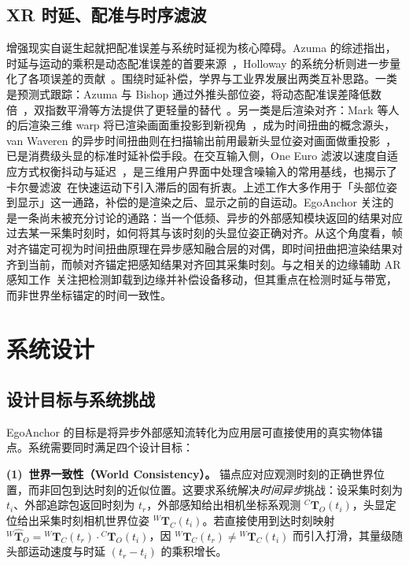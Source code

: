 \documentclass[review]{vgtc}
\begin{document}
\subsection{XR 时延、配准与时序滤波}
增强现实自诞生起就把配准误差与系统时延视为核心障碍。Azuma 的综述指出，时延与运动的乘积是动态配准误差的首要来源~\cite{azuma1997survey}，Holloway 的系统分析则进一步量化了各项误差的贡献~\cite{holloway1997registration}。围绕时延补偿，学界与工业界发展出两类互补思路。一类是预测式跟踪：Azuma 与 Bishop 通过外推头部位姿，将动态配准误差降低数倍~\cite{azuma1994improving}，双指数平滑等方法提供了更轻量的替代~\cite{laviola2003double}。另一类是后渲染对齐：Mark 等人的后渲染三维 warp 将已渲染画面重投影到新视角~\cite{mark1997postrendering}，成为时间扭曲的概念源头，van Waveren 的异步时间扭曲则在扫描输出前用最新头显位姿对画面做重投影~\cite{vanwaveren2016atw}，已是消费级头显的标准时延补偿手段。在交互输入侧，One Euro 滤波以速度自适应方式权衡抖动与延迟~\cite{casiez2012oneeuro}，是三维用户界面中处理含噪输入的常用基线，也揭示了卡尔曼滤波~\cite{kalman1960new}在快速运动下引入滞后的固有折衷。上述工作大多作用于「头部位姿到显示」这一通路，补偿的是渲染之后、显示之前的自运动。EgoAnchor 关注的是一条尚未被充分讨论的通路：当一个低频、异步的外部感知模块返回的结果对应过去某一采集时刻时，如何将其与该时刻的头显位姿正确对齐。从这个角度看，帧对齐锚定可视为时间扭曲原理在异步感知融合层的对偶，即时间扭曲把渲染结果对齐到当前，而帧对齐锚定把感知结果对齐回其采集时刻。与之相关的边缘辅助 AR 感知工作~\cite{liu2019edge,guan2022deepmix}关注把检测卸载到边缘并补偿设备移动，但其重点在检测时延与带宽，而非世界坐标锚定的时间一致性。

\section{系统设计}

\subsection{设计目标与系统挑战}

EgoAnchor 的目标是将异步外部感知流转化为应用层可直接使用的真实物体锚点。系统需要同时满足四个设计目标：

\noindent\textbf{(1)~世界一致性（World Consistency）。} 锚点应对应观测时刻的正确世界位置，而非回包到达时刻的近似位置。这要求系统解决\emph{时间异步}挑战：设采集时刻为 $t_i$、外部追踪包返回时刻为 $t_r$，外部感知给出相机坐标系观测 ${}^{C}\mathbf{T}_{O}(t_i)$，头显定位给出采集时刻相机世界位姿 ${}^{W}\mathbf{T}_{C}(t_i)$。若直接使用到达时刻映射 ${}^{W}\hat{\mathbf{T}}_{O} = {}^{W}\mathbf{T}_{C}(t_r)\cdot{}^{C}\mathbf{T}_{O}(t_i)$，因 ${}^{W}\mathbf{T}_{C}(t_r)\neq{}^{W}\mathbf{T}_{C}(t_i)$ 而引入打滑，其量级随头部运动速度与时延 $(t_r-t_i)$ 的乘积增长。
\end{document}
